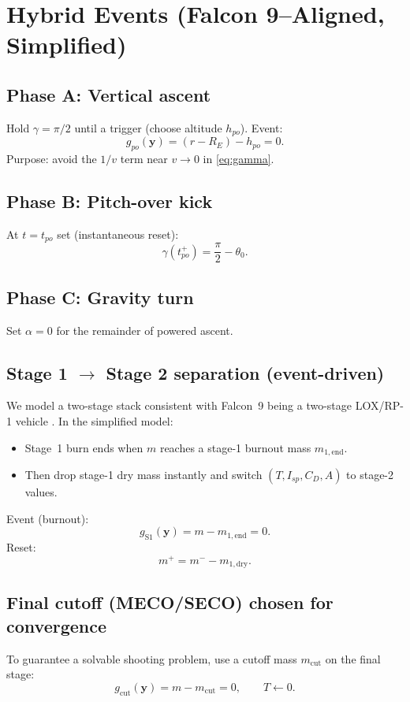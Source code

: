 \documentclass[11pt]{article}
\begin{document}
\section{Hybrid Events (Falcon 9--Aligned, Simplified)}
\subsection{Phase A: Vertical ascent}
Hold $\gamma=\pi/2$ until a trigger (choose altitude $h_{po}$).
Event:
\[
g_{po}(\bm{y}) = (r-R_E) - h_{po} = 0.
\]
Purpose: avoid the $1/v$ term near $v\to 0$ in \eqref{eq:gamma}.

\subsection{Phase B: Pitch-over kick}
At $t=t_{po}$ set (instantaneous reset):
\begin{equation}
\boxed{\gamma(t_{po}^+)=\frac{\pi}{2}-\theta_0.}
\end{equation}

\subsection{Phase C: Gravity turn}
Set $\alpha=0$ for the remainder of powered ascent.

\subsection{Stage 1 $\rightarrow$ Stage 2 separation (event-driven)}
We model a two-stage stack consistent with Falcon~9 being a two-stage LOX/RP-1 vehicle \cite{SpaceX_UsersGuide_2025}.
In the simplified model:
\begin{itemize}
\item Stage~1 burn ends when $m$ reaches a stage-1 burnout mass $m_{1,\text{end}}$.
\item Then drop stage-1 dry mass instantly and switch $(T,I_{sp},C_D,A)$ to stage-2 values.
\end{itemize}
Event (burnout):
\[
g_{\text{S1}}(\bm{y})=m-m_{1,\text{end}}=0.
\]
Reset:
\[
m^+ = m^- - m_{1,\text{dry}}.
\]

\subsection{Final cutoff (MECO/SECO) chosen for convergence}
To guarantee a solvable shooting problem, use a cutoff mass $m_{\text{cut}}$ on the final stage:
\[
g_{\text{cut}}(\bm{y}) = m - m_{\text{cut}} = 0,\qquad T\gets 0.
\]
\end{document}
